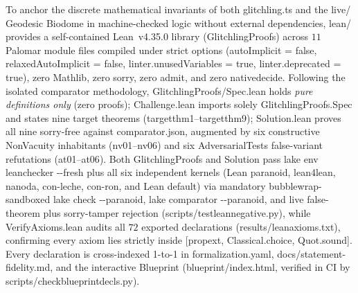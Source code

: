 \documentclass[11pt,a4paper]{article}
\numberwithin{equation}{section}
\theoremstyle{plain}
\theoremstyle{definition}
\theoremstyle{remark}
\newcommand{\code}[1]{{\ttfamily\footnotesize\def\_{\textunderscore\penalty0\hskip0pt}#1}}
\begin{document}
To anchor the discrete mathematical invariants of both \code{glitchling.ts} and the \code{live/} Geodesic Biodome in machine-checked logic without external dependencies, \code{lean/} provides a self-contained Lean~\code{v4.35.0} library (\code{Glitchling\allowbreak Proofs}) across $11$ Palomar \code{module} files compiled under strict options (\code{autoImplicit = false}, \code{relaxed\allowbreak AutoImplicit = false}, \code{linter.unusedVariables = true}, \code{linter.deprecated = true}), zero Mathlib, zero \code{sorry}, zero \code{admit}, and zero \code{native\_decide}. Following the isolated comparator methodology, \code{GlitchlingProofs/\allowbreak Spec.lean} holds \emph{pure definitions only} (zero proofs); \code{Challenge.lean} imports solely \code{GlitchlingProofs.\allowbreak Spec} and states nine target theorems (\code{target\_thm1}--\code{target\_thm9}); \code{Solution.lean} proves all nine sorry-free against \code{comparator.json}, augmented by six constructive \code{NonVacuity} inhabitants (\code{nv01}--\code{nv06}) and six \code{Adversarial\allowbreak Tests} false-variant refutations (\code{at01}--\code{at06}). Both \code{Glitchling\allowbreak Proofs} and \code{Solution} pass \code{lake} \code{env} \code{leanchecker} \code{{-}{-}fresh} plus all six independent kernels (\code{Lean} paranoid, \code{lean4lean}, \code{nanoda}, \code{con-leche}, \code{con-ron}, and \code{Lean} default) via mandatory bubblewrap-sandboxed \code{lake} \code{check} \code{{-}{-}paranoid}, \code{lake} \code{comparator} \code{{-}{-}paranoid}, and live false-theorem plus \code{sorry}-tamper rejection (\code{scripts/\allowbreak test\_lean\_negative.py}), while \code{Verify\allowbreak Axioms.lean} audits all $72$ exported declarations (\code{results/\allowbreak lean\_axioms.txt}), confirming every axiom lies strictly inside \code{[propext, Classical.choice, Quot.sound]}. Every declaration is cross-indexed 1-to-1 in \code{formalization.yaml}, \code{docs/\allowbreak statement-fidelity.md}, and the interactive Blueprint (\code{blueprint/\allowbreak index.html}, verified in CI by \code{scripts/\allowbreak check\_blueprint\_decls.py}).
\end{document}
